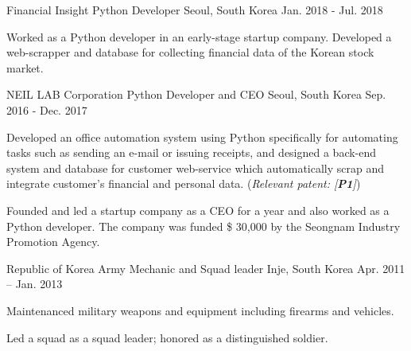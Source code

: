 


\begin{cventries}


\cventry
{Financial Insight} %
{Python Developer} %
{Seoul, South Korea} %
{Jan. 2018 - Jul. 2018} %
{ %
\begin{cvitems}
\item {Worked as a Python developer in an early-stage startup company. Developed a web-scrapper and database for collecting financial data of the Korean stock market.}
\end{cvitems}
}

\cventry
{NEIL LAB Corporation} %
{Python Developer and CEO} %
{Seoul, South Korea} %
{Sep. 2016 - Dec. 2017} %
{ %
\begin{cvitems}
\item {Developed an office automation system using Python specifically for automating tasks such as sending an e-mail or issuing receipts, and designed a back-end system and database for customer web-service which automatically scrap and integrate customer's financial and personal data. (\textit{Relevant patent: [\textbf{P1}]})}
\item {Founded and led a startup company as a CEO for a year and also worked as a Python developer. The company was funded \$ 30,000 by the Seongnam Industry Promotion Agency.}
\end{cvitems}
}

\cventry
{Republic of Korea Army} %
{Mechanic and Squad leader} %
{Inje, South Korea} %
{Apr. 2011 – Jan. 2013} %
{ %
\begin{cvitems}
\item {Maintenanced military weapons and equipment including firearms and vehicles.}
\item {Led a squad as a squad leader; honored as a distinguished soldier.}
\end{cvitems}
}


\end{cventries}